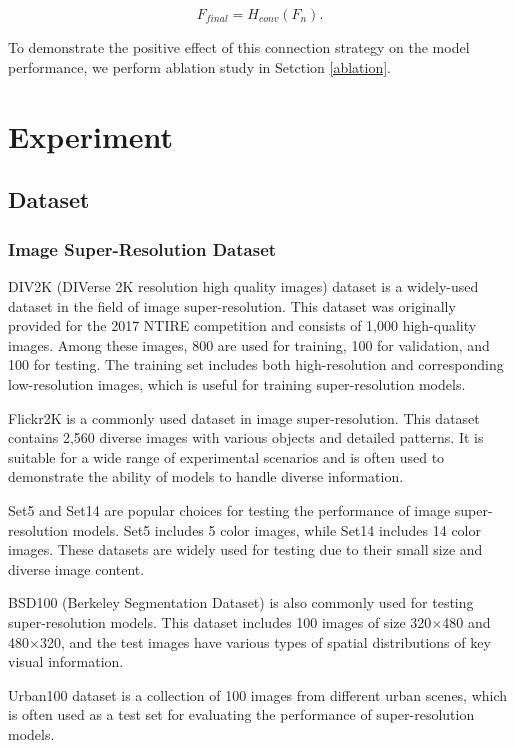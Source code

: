 \documentclass[default,iicol]{sn-jnl}
\theoremstyle{thmstyleone}\newtheorem{theorem}{Theorem}\newtheorem{proposition}[theorem]{Proposition}
\theoremstyle{thmstyletwo}\newtheorem{example}{Example}\newtheorem{remark}{Remark}\theoremstyle{thmstylethree}\newtheorem{definition}{Definition}
\begin{document}
\begin{equation}
F_{\textit{final}}= H_{\textit{conv}}(F_n).
\end{equation} 

To demonstrate the positive effect of this connection strategy on the model performance, we perform ablation study in Setction \ref{ablation}. 

\section{Experiment}
\label{experiment}
\subsection{Dataset}
\subsubsection{Image Super-Resolution Dataset}
DIV2K (DIVerse 2K resolution high quality images) dataset \cite{Ignatov2018} is a widely-used dataset in the field of image super-resolution. This dataset was originally provided for the 2017 NTIRE competition and consists of 1,000 high-quality images. Among these images, 800 are used for training, 100 for validation, and 100 for testing. The training set includes both high-resolution and corresponding low-resolution images, which is useful for training super-resolution models.

Flickr2K \cite{timofte2017ntire} is a commonly used dataset in image super-resolution. This dataset contains 2,560 diverse images with various objects and detailed patterns. It is suitable for a wide range of experimental scenarios and is often used to demonstrate the ability of models to handle diverse information.

Set5 \cite{bevilacqua2012low} and Set14 \cite{zeyde2012single} are popular choices for testing the performance of image super-resolution models. Set5 includes 5 color images, while Set14 includes 14 color images. These datasets are widely used for testing due to their small size and diverse image content.

BSD100 (Berkeley Segmentation Dataset) \cite{martin2001database} is also commonly used for testing super-resolution models. This dataset includes 100 images of size 320$\times$480 and 480$\times$320, and the test images have various types of spatial distributions of key visual information.

Urban100 dataset \cite{huang2015single} is a collection of 100 images from different urban scenes, which is often used as a test set for evaluating the performance of super-resolution models.
\end{document}
